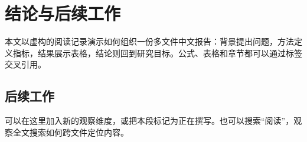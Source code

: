\section{结论与后续工作}
本文以虚构的阅读记录演示如何组织一份多文件中文报告：背景提出问题，方法定义指标，结果展示表格，结论则回到研究目标。公式、表格和章节都可以通过标签交叉引用。
\subsection{后续工作}
可以在这里加入新的观察维度，或把本段标记为正在撰写。也可以搜索“阅读”，观察全文搜索如何跨文件定位内容。
